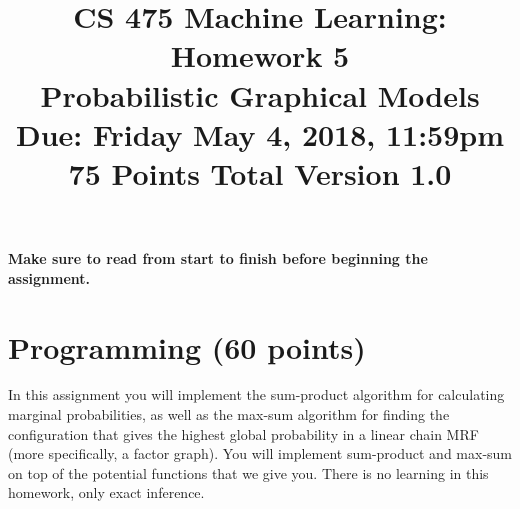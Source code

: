 \documentclass[11pt]{article}
\title{CS 475 Machine Learning: Homework 5\\Probabilistic Graphical Models\\
	\Large{Due: Friday May 4, 2018, 11:59pm}\\
	75 Points Total \hspace{1cm} Version 1.0}
\author{}
\date{}
\begin{document}
	\large
	\maketitle
	\thispagestyle{headings}
	
	\vspace{-.5in}
	
	{\bf Make sure to read from start to finish before beginning the assignment.}
\section{Programming (60 points)}

In this assignment you will implement the sum-product algorithm for calculating marginal probabilities, as well as the max-sum algorithm for finding the configuration that gives the highest global probability in a linear chain MRF (more specifically, a factor graph). You will implement sum-product and max-sum on top of the potential functions that we give you. There is no learning in this homework, only exact inference.
\end{document}
